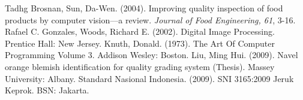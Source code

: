 \documentclass[laporan.tex]{subfiles}
\begin{document}
\begin{thebibliography}{99}
 Tadhg Brosnan, Sun, Da-Wen. (2004). Improving quality inspection of food products by computer vision––a review. \emph{Journal of Food Engineering, 61}, 3-16.
 Rafael C. Gonzales, Woods, Richard E. (2002). Digital Image Processing. Prentice Hall: New Jersey.
 Knuth, Donald. (1973). The Art Of Computer Programming Volume 3. Addison Wesley: Boston.
 Liu, Ming Hui. (2009). Navel orange blemish identification for quality grading system (Thesis). Massey University: Albany.
 Standard Nasional Indonesia. (2009). SNI 3165:2009 Jeruk Keprok. BSN: Jakarta.
\end{thebibliography}
\end{document}
